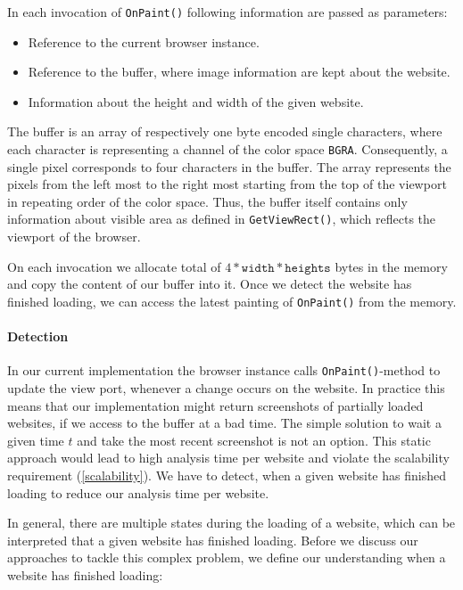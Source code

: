 In each invocation of \texttt{OnPaint()} following information are passed as parameters:

\begin{itemize}
\item Reference to the current browser instance.
\item Reference to the buffer, where image information are kept about the website.
\item Information about the height and width of the given website.
\end{itemize}

The buffer is an array of respectively one byte encoded single characters, where each character is representing a channel of the color space \texttt{BGRA}. Consequently, a single pixel corresponds to four characters in the buffer. The array represents the pixels from the left most to the right most starting from the top of the viewport in repeating order of the color space. Thus, the buffer itself contains only information about visible area as defined in \texttt{GetViewRect()}, which reflects the viewport of the browser.

On each invocation we allocate total of $4 * \texttt{width} * \texttt{heights}$ bytes in the memory and copy the content of our buffer into it. Once we detect the website has finished loading, we can access the latest painting of \texttt{OnPaint()} from the memory.

\paragraph{Detection}
\label{datacrawler_detection}
In our current implementation the browser instance calls \texttt{OnPaint()}-method to update the view port, whenever a change occurs on the website. In practice this means that our implementation might return screenshots of partially loaded websites, if we access to the buffer at a bad time. The simple solution to wait a given time $t$ and take the most recent screenshot is not an option. This static approach would lead to high analysis time per website and violate the scalability requirement (\ref{scalability}). We have to detect, when a given website has finished loading to reduce our analysis time per website.

In general, there are multiple states during the loading of a website, which can be interpreted that a given website has finished loading. Before we discuss our approaches to tackle this complex problem, we define our understanding when a website has finished loading:

